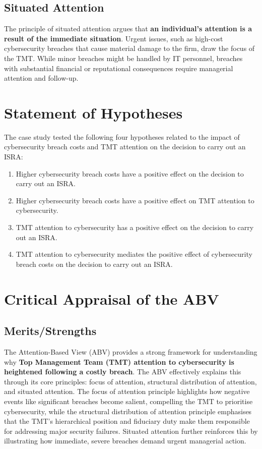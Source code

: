     \subsection{Situated Attention}
    The principle of situated attention argues that \textbf{an individual's attention is a result of the immediate situation}. Urgent issues, such as high-cost cybersecurity breaches that cause material damage to the firm, draw the focus of the TMT. While minor breaches might be handled by IT personnel, breaches with substantial financial or reputational consequences require managerial attention and follow-up.

\section{Statement of Hypotheses}
The case study tested the following four hypotheses related to the impact of cybersecurity breach costs and TMT attention on the decision to carry out an ISRA:
\begin{enumerate}
    \item Higher cybersecurity breach costs have a positive effect on the decision to carry out an ISRA.
    \item Higher cybersecurity breach costs have a positive effect on TMT attention to cybersecurity.
    \item TMT attention to cybersecurity has a positive effect on the decision to carry out an ISRA.
    \item TMT attention to cybersecurity mediates the positive effect of cybersecurity breach costs on the decision to carry out an ISRA.
\end{enumerate}

\section{Critical Appraisal of the ABV}

    \subsection{Merits/Strengths}
    The Attention-Based View (ABV) provides a strong framework for understanding why \textbf{Top Management Team (TMT) attention to cybersecurity is heightened following a costly breach}. The ABV effectively explains this through its core principles: focus of attention, structural distribution of attention, and situated attention. The focus of attention principle highlights how negative events like significant breaches become salient, compelling the TMT to prioritise cybersecurity, while the structural distribution of attention principle emphasises that the TMT's hierarchical position and fiduciary duty make them responsible for addressing major security failures. Situated attention further reinforces this by illustrating how immediate, severe breaches demand urgent managerial action.

